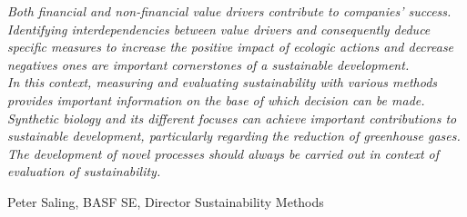 \thispagestyle{empty}

\vspace*{\fill}

\noindent \textit{Both financial and non-financial value drivers contribute to companies' success. Identifying interdependencies between value drivers and consequently deduce specific measures to increase the positive impact of ecologic actions and decrease negatives ones are important cornerstones of a sustainable development.} \\
	
	
\noindent \textit{In this context, measuring and evaluating sustainability with various methods provides important information on the base of which decision can be made.} \\


\noindent \textit{Synthetic biology and its different focuses can achieve important contributions to sustainable development, particularly regarding the reduction of greenhouse gases. The development of novel processes should always be carried out in context of evaluation of sustainability.} \\\bigskip


Peter Saling, BASF SE, Director Sustainability Methods


\vspace*{\fill}